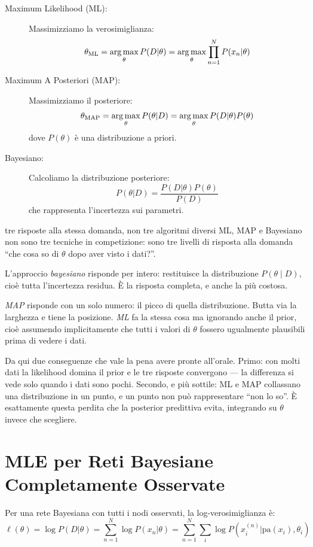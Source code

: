 \begin{description}
  \item[Maximum Likelihood (ML):] Massimizziamo la verosimiglianza:
  \[\theta_{\text{ML}} = \operatorname*{arg\,max}_\theta P(D|\theta) = \operatorname*{arg\,max}_\theta \prod_{n=1}^N P(x_n|\theta)\]

  \item[Maximum A Posteriori (MAP):] Massimizziamo il posteriore:
  \[\theta_{\text{MAP}} = \operatorname*{arg\,max}_\theta P(\theta|D) = \operatorname*{arg\,max}_\theta P(D|\theta)P(\theta)\]
  dove $P(\theta)$ è una distribuzione a priori.

  \item[Bayesiano:] Calcoliamo la distribuzione posteriore:
  \[P(\theta|D) = \frac{P(D|\theta)P(\theta)}{P(D)}\]
  che rappresenta l'incertezza sui parametri.
\end{description}

\begin{intuizione}{tre risposte alla stessa domanda, non tre algoritmi diversi}
ML, MAP e Bayesiano non sono tre tecniche in competizione: sono tre livelli di risposta alla domanda ``che cosa so di $\theta$ dopo aver visto i dati?''.

L'approccio \emph{bayesiano} risponde per intero: restituisce la distribuzione $P(\theta \mid D)$, cioè tutta l'incertezza residua. È la risposta completa, e anche la più costosa.

\emph{MAP} risponde con un solo numero: il picco di quella distribuzione. Butta via la larghezza e tiene la posizione. \emph{ML} fa la stessa cosa ma ignorando anche il prior, cioè assumendo implicitamente che tutti i valori di $\theta$ fossero ugualmente plausibili prima di vedere i dati.

Da qui due conseguenze che vale la pena avere pronte all'orale. Primo: con molti dati la likelihood domina il prior e le tre risposte convergono — la differenza si vede solo quando i dati sono pochi. Secondo, e più sottile: ML e MAP collassano una distribuzione in un punto, e un punto non può rappresentare ``non lo so''. È esattamente questa perdita che la posterior predittiva evita, integrando su $\theta$ invece che scegliere.
\end{intuizione}

\section{MLE per Reti Bayesiane Completamente Osservate}

Per una rete Bayesiana con tutti i nodi osservati, la log-verosimiglianza è:
\[\ell(\theta) = \log P(D|\theta) = \sum_{n=1}^N \log P(x_n|\theta) = \sum_{n=1}^N \sum_i \log P(x^{(n)}_i | \text{pa}(x_i), \theta_i)\]

